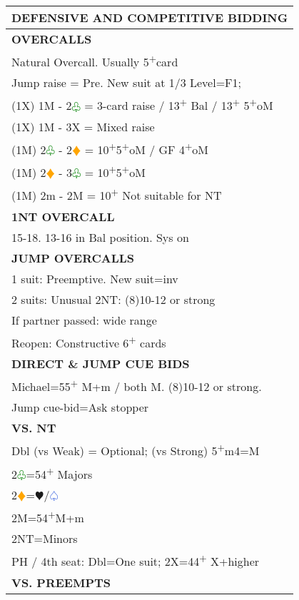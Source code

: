 \documentclass{article}
\renewcommand{\sp}{\textcolor{RoyalBlue}{$\varspade$}}
\newcommand{\he}{\textcolor{RubineRed}{$\varheart$}}
\newcommand{\di}{\textcolor{Orange}{$\vardiamond$}}
\newcommand{\cl}{\textcolor{Green}{$\varclub$}}
\newcommand{\nt}{\relsize{-1}NT\relsize{1}}
\newcommand{\up}{\textsuperscript{+}}
\begin{document}
\noindent
\small{
\begin{minipage}{90mm}
	\begin{tabular}{| p{88mm} |}
		\hline
		\cellcolor[gray]{0.9} \textbf{DEFENSIVE AND COMPETITIVE BIDDING} \\ \hline
		\cellcolor[gray]{0.9} \textbf{OVERCALLS} \\ \hline
		Natural Overcall. Usually 5\up{}card \\ \hline
		Jump raise = Pre. New suit at 1/3 Level=F1; \\ \hline
		(1X) 1M - 2\cl{} = 3-card raise / 13\up{} Bal / 13\up{} 5\up{}oM \\ \hline
		(1X) 1M - 3X = Mixed raise \\ \hline
		(1M) 2\cl{} - 2\di{} = 10\up{}5\up{}oM / GF 4\up{}oM \\ \hline
		(1M) 2\di{} - 3\cl{} = 10\up{}5\up{}oM \\ \hline
		(1M) 2m - 2M = 10\up{} Not suitable for \nt{} \\ \hline
		\cellcolor[gray]{0.9} \textbf{1NT OVERCALL} \\ \hline
		15-18. 13-16 in Bal position. Sys on \\ \hline
		\cellcolor[gray]{0.9} \textbf{JUMP OVERCALLS} \\ \hline
		1 suit: Preemptive. New suit=inv \\ \hline
		2 suits: Unusual 2\nt{}: (8)10-12 or strong \\ \hline
		If partner passed: wide range \\ \hline
		Reopen: Constructive 6\up{} cards \\ \hline
		\cellcolor[gray]{0.9} \textbf{DIRECT \& JUMP CUE BIDS} \\ \hline
		Michael=55\up{} M+m / both M. (8)10-12 or strong. \\ \hline
		Jump cue-bid=Ask stopper \\ \hline
		\cellcolor[gray]{0.9} \textbf{VS. NT} \\ \hline
		Dbl (vs Weak) = Optional; (vs Strong) 5\up{}m4=M \\ \hline
		2\cl{}=54\up{} Majors\\ \hline
		2\di{}=\he{}/\sp{}\\ \hline
		2M=54\up{}M+m\\ \hline
		2\nt{}=Minors\\ \hline
		PH / 4th seat: Dbl=One suit; 2X=44\up{} X+higher \\ \hline
		\cellcolor[gray]{0.9} \textbf{VS. PREEMPTS} \\ \hline

\end{tabular}
\end{minipage}}
\end{document}
